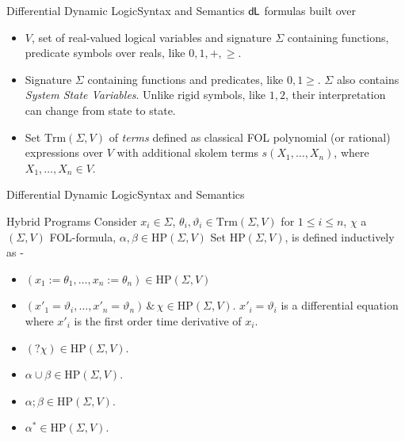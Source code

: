 \documentclass{beamer}
\newcommand{\dL}{\text{\upshape\textsf{d{\kern-0.05em}L}}}
\newcommand{\Trm}{\text{Trm}}
\newcommand{\HP}{\text{HP}}
\begin{document}
\begin{frame}{Differential Dynamic Logic}{Syntax and Semantics}
    $\dL$ formulas built over
    \begin{itemize}
      \item $V$, set of real-valued logical variables and
     signature $\Sigma$ containing functions, predicate symbols over reals, like
     $0, 1, +, \geq$.
   \item Signature $\Sigma$ containing functions and predicates, like $0, 1
     \geq$.  $\Sigma$ also contains \textit{System State Variables}. Unlike rigid
   symbols, like $1, 2$, their interpretation can change from state to state.
 \item Set $\text{Trm}(\Sigma,V)$ of \textit{terms} defined as classical FOL polynomial (or
   rational) expressions over $V$ with additional skolem terms $s(X_1, \dots,
   X_n)$, where $X_1, \dots, X_n \in V$.
 \end{itemize}
\end{frame}

\begin{frame}{Differential Dynamic Logic}{Syntax and Semantics}
  \begin{block}{Hybrid Programs}
  Consider $x_i \in \Sigma$, $\theta_i, \vartheta_i \in \Trm(\Sigma, V)$ for
  $1 \leq i \leq n$, $\chi$ a $(\Sigma,V)$ FOL-formula, $\alpha, \beta \in
  \HP(\Sigma,V)$
    Set $\HP(\Sigma,V)$, is defined inductively as -
    \begin{itemize}
      \item  $(x_1 := \theta_1, \ldots , x_n := \theta_n) \in \HP(\Sigma,V)$
      \item $ (x'_1 = \vartheta_i, \ldots , x'_n = \vartheta_n)\, \& \, \chi \in
        \HP(\Sigma,V)$. $x'_i = \vartheta_i$ is a differential equation where
        $x'_i$ is the first order time derivative of $x_i$.
      \item $(?\chi) \in \HP(\Sigma,V)$.
      \item $\alpha \cup \beta \in \HP(\Sigma, V)$.
      \item $\alpha;\beta \in \HP(\Sigma, V)$.
      \item $\alpha^* \in \HP(\Sigma, V)$.
    \end{itemize}
  \end{block}
\end{frame}
\end{document}

